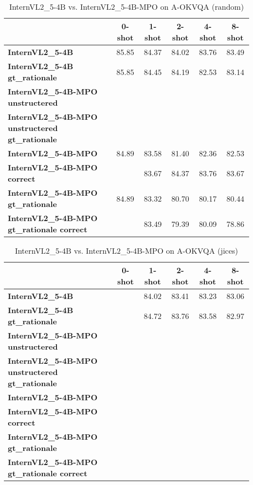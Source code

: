 \begin{table}
\caption{InternVL2\_5-4B vs. InternVL2\_5-4B-MPO on A-OKVQA (random)}
\label{tab:InternVL2_5-4B_A-OKVQA_TRAIN_random}
\begin{tabular}{lccccc}
\toprule
 & 0-shot & 1-shot & 2-shot & 4-shot & 8-shot \\
\midrule
\textbf{InternVL2\_5-4B} & 85.85 & 84.37 & 84.02 & 83.76 & 83.49 \\
\textbf{InternVL2\_5-4B gt\_rationale} & 85.85 & 84.45 & 84.19 & 82.53 & 83.14 \\
\textbf{InternVL2\_5-4B-MPO unstructered} &  &  &  &  &  \\
\textbf{InternVL2\_5-4B-MPO unstructered gt\_rationale} &  &  &  &  &  \\
\textbf{InternVL2\_5-4B-MPO} & 84.89 & 83.58 & 81.40 & 82.36 & 82.53 \\
\textbf{InternVL2\_5-4B-MPO correct} &  & 83.67 & 84.37 & 83.76 & 83.67 \\
\textbf{InternVL2\_5-4B-MPO gt\_rationale} & 84.89 & 83.32 & 80.70 & 80.17 & 80.44 \\
\textbf{InternVL2\_5-4B-MPO gt\_rationale correct} &  & 83.49 & 79.39 & 80.09 & 78.86 \\
\bottomrule
\end{tabular}
\end{table}


\begin{table}
\caption{InternVL2\_5-4B vs. InternVL2\_5-4B-MPO on A-OKVQA (jices)}
\label{tab:InternVL2_5-4B_A-OKVQA_TRAIN_jices}
\begin{tabular}{lccccc}
\toprule
 & 0-shot & 1-shot & 2-shot & 4-shot & 8-shot \\
\midrule
\textbf{InternVL2\_5-4B} &  & 84.02 & 83.41 & 83.23 & 83.06 \\
\textbf{InternVL2\_5-4B gt\_rationale} &  & 84.72 & 83.76 & 83.58 & 82.97 \\
\textbf{InternVL2\_5-4B-MPO unstructered} &  &  &  &  &  \\
\textbf{InternVL2\_5-4B-MPO unstructered gt\_rationale} &  &  &  &  &  \\
\textbf{InternVL2\_5-4B-MPO} &  &  &  &  &  \\
\textbf{InternVL2\_5-4B-MPO correct} &  &  &  &  &  \\
\textbf{InternVL2\_5-4B-MPO gt\_rationale} &  &  &  &  &  \\
\textbf{InternVL2\_5-4B-MPO gt\_rationale correct} &  &  &  &  &  \\
\bottomrule
\end{tabular}
\end{table}


